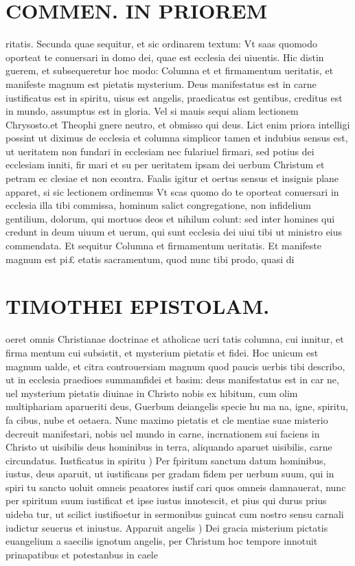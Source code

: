 \documentclass{article}
\begin{document}
\begin{pages}
\section*{COMMEN. IN PRIOREM }
\marginpar{[ p.90 ]}\pstart ritatis. Secunda quae sequitur, et sic ordinarem textum: Vt saas quomodo oporteat te conuersari in domo dei, quae est ecclesia dei uiuentis. Hic distin guerem, et subsequeretur hoc modo: Columna et et firmamentum ueritatis, et manifeste magnum est pietatis mysterium. Deus manifestatus est in carne iustificatus est in spiritu, uisus est angelis, praedicatus est gentibus, creditus est in mundo, assumptus est in gloria. Vel si mauis sequi aliam lectionem Chrysosto.et Theophi gnere neutro, et obmisso qui deus. Lict enim priora intelligi possint ut diximus de ecclesia et columna simplicor tamen et indubius sensus est, ut ueritatem non fundari in ecclesiam nec fulariuel firmari, sed potius dei ecclesiam inniti, fir mari et su per ueritatem ipsam dei uerbum Christum et petram ec clesiae et non econtra. Faalis igitur et oertus sensus et insignis plane apparet, si sic lectionem ordinemus Vt scas quomo do te oporteat conuersari in ecclesia illa tibi commissa, hominum salict congregatione, non infidelium gentilium, dolorum, qui mortuos deos et nihilum colunt: sed inter homines qui credunt in deum uiuum et uerum, qui sunt ecclesia dei uiui tibi ut ministro eius commendata. Et sequitur Columna et firmamentum ueritatis. Et manifeste magnum est pi£ etatis sacramentum, quod nunc tibi prodo, quasi di\pend
\section*{TIMOTHEI EPISTOLAM. }
\marginpar{[ p.91 ]}\pstart oeret omnis Christianae doctrinae et atholicae ucri tatis columna, cui innitur, et firma mentum cui subsistit, et mysterium pietatis et fidei. Hoc unicum est magnum ualde, et citra controuersiam magnum quod paucis uerbis tibi describo, ut in ecclesia praedioes summamfidei et basim: deus manifestatus est in car ne, uel mysterium pietatis diuinae in Christo nobis ex hibitum, cum olim multiphariam aparueriti deus, Guerbum deiangelis specie hu ma na, igne, spiritu, fa cibus, nube et oetaera. Nunc maximo pietatis et cle mentiae suae misterio decreuit manifestari, nobis uel mundo in carne, incrnationem sui faciens in Christo ut uisibilis deus hominibus in terra, aliquando aparuet uisibilis, carne circundatus.  \pend\pstart Iustficatus in spiritu ) Per fpiritum sanctum datum hominibus, iustus, deus aparuit, ut iustificans per gradam fidem per uerbum suum, qui in spiri tu sancto uoluit omneis peaatores iustif cari quos omneis damnauerat, nunc per spiritum suum iustificat et ipse iustus innotescit, et pius qui durus prius uideba tur, ut scilict iustifioetur in sermonibus guincat cum nostro sensu carnali iudictur seuerus et iniustus. Apparuit angelis ) Dei gracia misterium pictatis euangelium a saecilis ignotum angelis, per Christum hoc tempore innotuit prinapatibus et potestanbus in caele  \pend

\end{pages}
\end{document}
